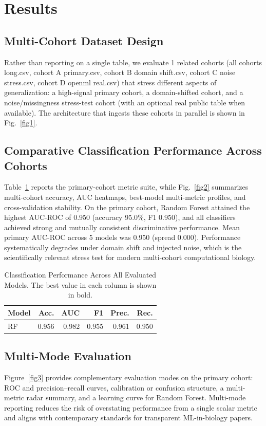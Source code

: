 \documentclass[conference]{IEEEtran}
\begin{document}
\section{Results}
\label{sec:results}
\subsection{Multi-Cohort Dataset Design}
Rather than reporting on a single table, we evaluate 1 related cohorts
(all cohorts long.csv, cohort A primary.csv, cohort B domain shift.csv, cohort C noise stress.csv, cohort D openml real.csv) that stress different aspects of generalization: a high-signal primary cohort,
a domain-shifted cohort, and a noise/missingness stress-test cohort (with an optional real
public table when available). The architecture that ingests these cohorts in parallel is
shown in Fig.~\ref{fig1}.

\subsection{Comparative Classification Performance Across Cohorts}
Table~\ref{tab:results} reports the primary-cohort metric suite, while Fig.~\ref{fig2}
summarizes multi-cohort accuracy, AUC heatmaps, best-model multi-metric profiles, and
cross-validation stability. On the primary cohort, Random Forest attained the highest
AUC-ROC of 0.950 (accuracy 95.0\%, F1 0.950), and all classifiers achieved strong and mutually consistent discriminative performance.
Mean primary AUC-ROC across 5 models was 0.950 (spread 0.000).
Performance systematically degrades under domain shift and injected noise, which is the
scientifically relevant stress test for modern multi-cohort computational biology.

\begin{table}[!t]
\caption{Classification Performance Across All Evaluated Models. The best value in each column is shown in bold.}
\label{tab:results}
\centering
\begin{tabular}{lrrrrr}
\toprule
Model & Acc. & AUC & F1 & Prec. & Rec. \\
\midrule
        RF & 0.956 & 0.982 & 0.955 & 0.961 & 0.950 \\
\bottomrule
\end{tabular}
\end{table}




\subsection{Multi-Mode Evaluation}
Figure~\ref{fig3} provides complementary evaluation modes on the primary cohort: ROC and
precision--recall curves, calibration or confusion structure, a multi-metric radar summary,
and a learning curve for Random Forest. Multi-mode reporting reduces the risk of overstating
performance from a single scalar metric and aligns with contemporary standards for transparent
ML-in-biology papers.
\end{document}
